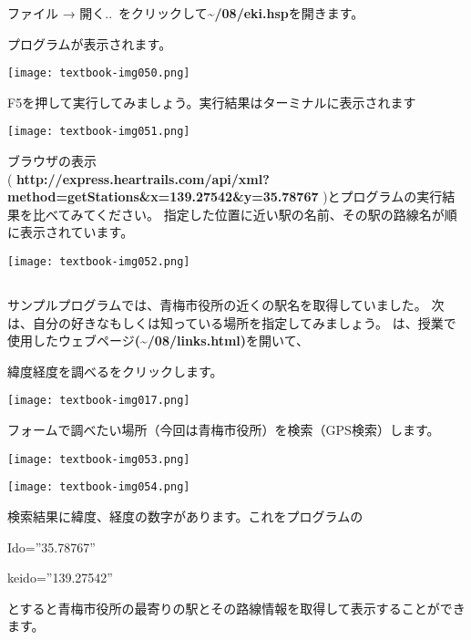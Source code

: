 ファイル → 開く..\ をクリックして\textbf{{\textasciitilde}/08/eki.hsp}を開きます。

プログラムが表示されます。

\begin{center}
    \texttt{[image: textbook-img050.png]}
\end{center}

\clearpage
F5を押して実行してみましょう。実行結果はターミナルに表示されます
\begin{center}
    \texttt{[image: textbook-img051.png]}
\end{center}
ブラウザの表示\\(
\textbf{http://express.heartrails.com/api/xml?method=getStations\&x=139.27542\&y=35.78767}
)とプログラムの実行結果を比べてみてください。
指定した位置に近い駅の名前、その駅の路線名が順に表示されています。

\begin{center}
    \texttt{[image: textbook-img052.png]}
\end{center}


\clearpage
\subsection*{\theQuestion\label{Q:station}}
サンプルプログラムでは、青梅市役所の近くの駅名を取得していました。
次は、自分の好きなもしくは知っている場所を指定してみましょう。
は、授業で使用したウェブページ\textbf{({\textasciitilde}/08/links.html)}を開いて、

緯度経度を調べるをクリックします。
\begin{center}
    \texttt{[image: textbook-img017.png]}
\end{center}

フォームで調べたい場所（今回は青梅市役所）を検索（GPS検索）します。
\begin{center}
    \texttt{[image: textbook-img053.png]}
\end{center}

\begin{center}
    \texttt{[image: textbook-img054.png]}
\end{center}

検索結果に緯度、経度の数字があります。これをプログラムの
\begin{center}
\begin{boxedminipage}{7.959cm}
Ido=”35.78767”

keido=”139.27542”
\end{boxedminipage}
\end{center}

とすると青梅市役所の最寄りの駅とその路線情報を取得して表示することができます。
